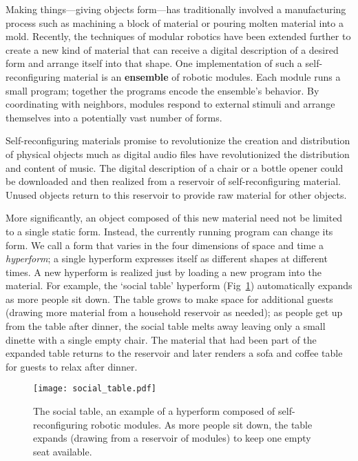 Making things---giving objects form---has traditionally involved a manufacturing process such as machining a block of material or pouring molten material into a mold. 
Recently, the techniques of modular robotics have been extended further to create a new kind of material that can receive a digital description of a desired form and arrange itself into that shape. 
One implementation of such a self{}-reconfiguring material is an \textbf{ensemble} of robotic modules. 
Each module runs a small program; together the programs encode the ensemble's behavior. 
By coordinating with neighbors, modules respond to external stimuli and arrange themselves into a potentially vast number of forms.

Self{}-reconfiguring materials promise to revolutionize the creation and distribution of physical objects much as digital audio files have revolutionized the distribution and content of music. 
The digital description of a chair or a bottle opener could be downloaded and then realized from a reservoir of self{}-reconfiguring material. 
Unused objects return to this reservoir to provide raw material for other objects.

More significantly, an object composed of this new material need not be limited to a single static form. 
Instead, the currently running program can change its form. 
We call a form that varies in the four dimensions of space and time a \emph{hyperform}; a single hyperform expresses itself as different shapes at different times.  
A new hyperform is realized just by loading a new program into the material. 
For example, the `social table' hyperform (Fig~\ref{fig:social_table}) automatically expands as more people sit down. 
The table grows to make space for additional guests (drawing more material from a household reservoir as needed); as people get up from the table after dinner, the social table melts away leaving only a small dinette with a single empty chair. 
The material that had been part of the expanded table returns to the reservoir and later renders a sofa and coffee table for guests to relax after dinner.

\begin{figure}[tb]
  \centering
    \texttt{[image: social\_table.pdf]}
  \caption{The social table, an example of a hyperform composed of self-reconfiguring robotic modules. As more people sit down, the table expands (drawing from a reservoir of modules) to keep one empty seat available.}
  \label{fig:social_table}
\end{figure}

